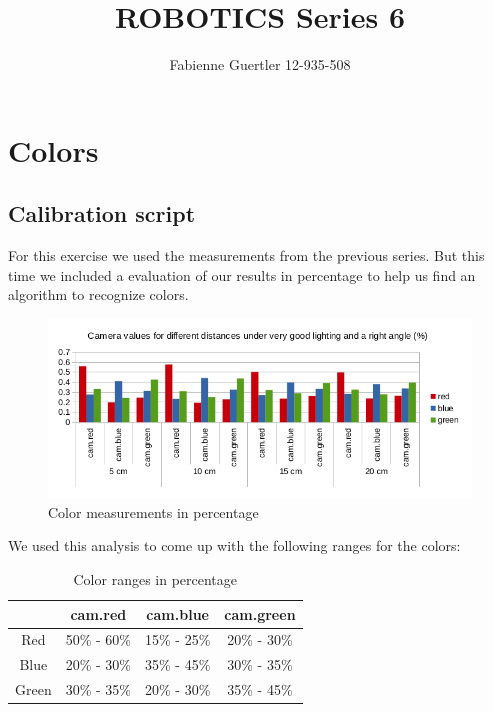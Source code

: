 \documentclass[a4paper]{article}
\title{ROBOTICS Series 6}
\author{Fabienne Guertler 12-935-508}
\begin{document}
	\section{Colors}
		\subsection{Calibration script}
			For this exercise we used the measurements from the previous series. But this time 				we included a evaluation of our results in percentage to help us find an algorithm
			to recognize colors.
			
			\begin{figure}[h!]
				\includegraphics[width=\linewidth]{CamValuesPerc.png}
				\caption{Color measurements in percentage}
			\end{figure}						
			
			\noindent We used this analysis to come up with the following ranges for the 
			colors:
								
			\begin{table}[h!]
				\begin{center}
				\begin{tabular}{c||c|c|c}
					& cam.red & cam.blue & cam.green\\
					\hline
					\hline
					Red & 50\% - 60\% & 15\% - 25\% & 20\% - 30\% \\
					Blue & 20\% - 30\% & 35\% - 45\% & 30\% - 35\% \\
					Green & 30\% - 35\% & 20\% - 30\% & 35\% - 45\% \\ 
				\end{tabular}
				\caption{Color ranges in percentage}
				\label{tab:ColorRanges}
				\end{center}	
			\end{table}
			
\end{document}
